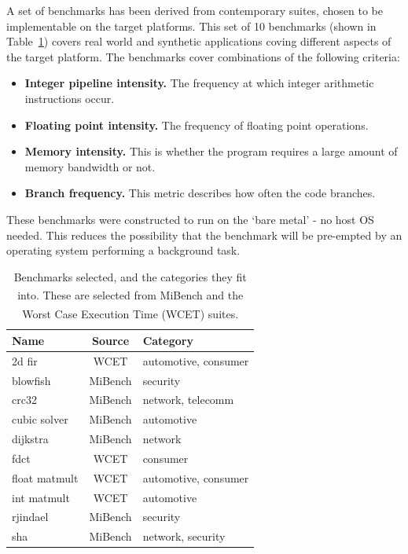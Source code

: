 \documentclass[twocolumn]{article}
\let\oldcite\cite
\renewcommand{\cite}[1]{\textsuperscript{\oldcite{#1}}}
\begin{document}
A set of benchmarks has been derived from contemporary suites, chosen to be implementable on the target platforms. This set of 10 benchmarks (shown in Table~\ref{Table:Benchmarks}) covers real world and synthetic applications coving different aspects of the target platform. The benchmarks cover combinations of the following criteria:
\begin{itemize}
	\setlength{\itemsep}{0em}
	\vspace{-1mm}
	\item \textbf{Integer pipeline intensity.} The frequency at which integer arithmetic instructions occur.
	\item \textbf{Floating point intensity.} The frequency of floating point operations.
	\item \textbf{Memory intensity.} This is whether the program requires a large amount of memory bandwidth or not.
	\item \textbf{Branch frequency.} This metric describes how often the code branches.
\end{itemize}

These benchmarks were constructed to run on the `bare metal' - no host OS needed. This reduces the possibility that the benchmark will be pre-empted by an operating system performing a background task.

\begin{table}[t]
	\centering
	\begin{tabular}{l c l}
	\textbf{Name}			& \textbf{Source} 	& \textbf{Category} \\
	\hline
	2d fir					& WCET 		& automotive, consumer	\\
	blowfish				& MiBench 	& security	\\
	crc32					& MiBench 	& network, telecomm	\\
	cubic solver			& MiBench 	& automotive	\\
	dijkstra				& MiBench 	& network	\\
	fdct					& WCET 		& consumer	\\
	float matmult			& WCET 		& automotive, consumer	\\
	int matmult				& WCET	 	& automotive	\\
	rjindael				& MiBench 	& security	\\
	sha						& MiBench 	& network, security	\\
	\end{tabular}
\caption{Benchmarks selected, and the categories they fit into. These are selected from MiBench\cite{MiBench} and the Worst Case Execution Time (WCET)\cite{WCET} suites.}
\label{Table:Benchmarks}
\end{table}
\end{document}
